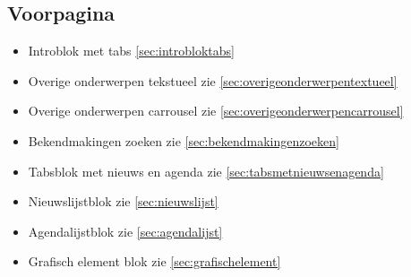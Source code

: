 \subsection{Voorpagina}
\label{sec:voorpagina}

\begin{itemize}
  \item Introblok met tabs \ref{sec:introbloktabs}
  \item Overige onderwerpen tekstueel zie \ref{sec:overigeonderwerpentextueel}
  \item Overige onderwerpen carrousel zie \ref{sec:overigeonderwerpencarrousel}
  \item Bekendmakingen zoeken zie \ref{sec:bekendmakingenzoeken}
  \item Tabsblok met nieuws en agenda zie \ref{sec:tabsmetnieuwsenagenda}
  \item Nieuwslijstblok zie \ref{sec:nieuwslijst}
  \item Agendalijstblok zie \ref{sec:agendalijst}
  \item Grafisch element blok zie \ref{sec:grafischelement}
\end{itemize}